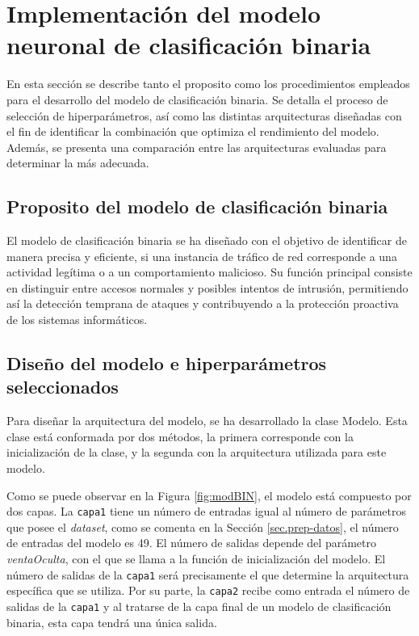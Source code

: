 \section{Implementación del modelo neuronal de clasificación binaria} \label{sec.modBIN}
En esta sección se describe tanto el proposito como los procedimientos empleados para el desarrollo del modelo de clasificación binaria. Se detalla el proceso de selección de hiperparámetros, así como las distintas arquitecturas diseñadas con el fin de identificar la combinación que optimiza el rendimiento del modelo. Además, se presenta una comparación entre las arquitecturas evaluadas para determinar la más adecuada.


\subsection{Proposito del modelo de clasificación binaria}
El modelo de clasificación binaria se ha diseñado con el objetivo de identificar de manera precisa y eficiente, si una instancia de tráfico de red corresponde a una actividad legítima o a un comportamiento malicioso. Su función principal consiste en distinguir entre accesos normales y posibles intentos de intrusión, permitiendo así la detección temprana de ataques y contribuyendo a la protección proactiva de los sistemas informáticos.

\subsection{Diseño del modelo e hiperparámetros seleccionados} \label{sec:disBIN}
Para diseñar la arquitectura del modelo, se ha desarrollado la clase Modelo. Esta clase está conformada por dos métodos, la primera corresponde con la inicialización de la clase, y la segunda con la arquitectura utilizada para este modelo.

Como se puede observar en la Figura \ref{fig:modBIN}, el modelo está compuesto por dos capas. La \texttt{capa1} tiene un número de entradas igual al número de parámetros que posee el \textit{dataset}, como se comenta en la Sección \ref{sec.prep-datos}, el número de entradas del modelo es 49. El número de salidas depende del parámetro \textit{ventaOculta}, con el que se llama a la función de inicialización del modelo. El número de salidas de la \texttt{capa1} será precisamente el que determine la arquitectura específica que se utiliza. Por su parte, la \texttt{capa2} recibe como entrada el número de salidas de la \texttt{capa1} y al tratarse de la capa final de un modelo de clasificación binaria, esta capa tendrá una única salida.

